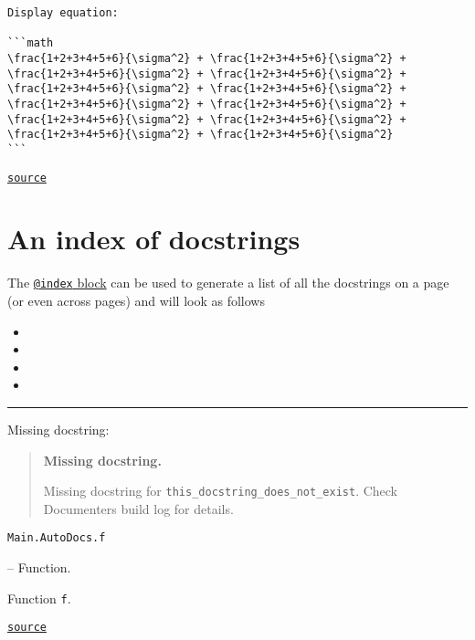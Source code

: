 \begin{adjustwidth}{2em}{0pt}
\begin{lstlisting}
Display equation:

```math
\frac{1+2+3+4+5+6}{\sigma^2} + \frac{1+2+3+4+5+6}{\sigma^2} + \frac{1+2+3+4+5+6}{\sigma^2} + \frac{1+2+3+4+5+6}{\sigma^2} + \frac{1+2+3+4+5+6}{\sigma^2} + \frac{1+2+3+4+5+6}{\sigma^2} + \frac{1+2+3+4+5+6}{\sigma^2} + \frac{1+2+3+4+5+6}{\sigma^2} + \frac{1+2+3+4+5+6}{\sigma^2} + \frac{1+2+3+4+5+6}{\sigma^2} + \frac{1+2+3+4+5+6}{\sigma^2} + \frac{1+2+3+4+5+6}{\sigma^2}
```
\end{lstlisting}



\href{https://example.org/Repository.jl/blob/test/examples/make.jl#L41-71}{\texttt{source}}


\end{adjustwidth}

\section{An index of docstrings}



\label{4901604269105032859}{}


The \href{@ref}{\texttt{@index} block} can be used to generate a list of all the docstrings on a page (or even across pages) and will look as follows


\begin{itemize}
\item {}
\item {}
\item {}
\item {}
\end{itemize}


{\rule{\textwidth}{1pt}}


Missing docstring:



\begin{quote}
\textbf{Missing docstring.}

Missing docstring for \texttt{this\_docstring\_does\_not\_exist}. Check Documenter{\textquotesingle}s build log for details.

\end{quote}

\hypertarget{5308965026370084775}{\texttt{Main.AutoDocs.f}}  -- {Function.}

\begin{adjustwidth}{2em}{0pt}

Function \texttt{f}.



\href{https://example.org/Repository.jl/blob/test/examples/make.jl#L85-85}{\texttt{source}}


\end{adjustwidth}


